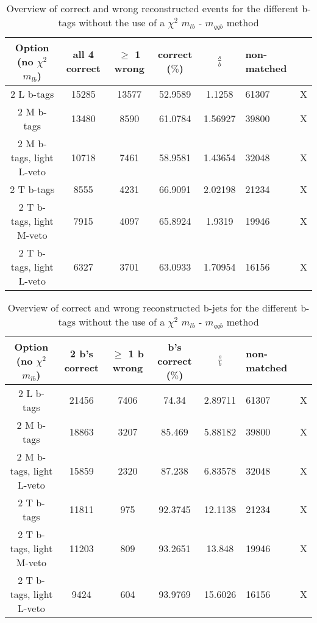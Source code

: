  \begin{table}[!h] 
 \begin{tabular}{c|c|c|c|c} 
\textbf{Option} (no $\chi^{2}$ $m_{lb}$) & all 4 correct & $\geq$ 1 wrong & correct ($\%$)       & $\frac{s}{b}$ & non-matched \\  L b-tags              & 15285 & 13577 & 52.9589 & 1.1258 & 61307 & X \\ 
2 M b-tags              & 13480 & 8590 & 61.0784 & 1.56927 & 39800 & X \\ 
2 M b-tags, light L-veto & 10718 & 7461 & 58.9581 & 1.43654 & 32048 & X \\ 
2 T b-tags              & 8555 & 4231 & 66.9091 & 2.02198 & 21234 & X \\ 
2 T b-tags, light M-veto & 7915 & 4097 & 65.8924 & 1.9319 & 19946 & X \\ 
2 T b-tags, light L-veto & 6327 & 3701 & 63.0933 & 1.70954 & 16156 & X \\ 
 \end{tabular} 
\caption{Overview of correct and wrong reconstructed events for the different b-tags without the use of a $\chi^{2}$ $m_{lb}$ - $m_{qqb}$ method} 
 \end{table} 
 
 \begin{table}[!h] 
 \begin{tabular}{c|c|c|c|c} 
\textbf{Option} (no $\chi^{2}$ $m_{lb}$) & 2 b's correct & $\geq$ 1 b wrong & b's correct ($\%$) & $\frac{s}{b}$ & non-matched \\  L b-tags              & 21456 & 7406 & 74.34 & 2.89711 & 61307 & X \\ 
2 M b-tags              & 18863 & 3207 & 85.469 & 5.88182 & 39800 & X \\ 
2 M b-tags, light L-veto & 15859 & 2320 & 87.238 & 6.83578 & 32048 & X \\ 
2 T b-tags              & 11811 & 975 & 92.3745 & 12.1138 & 21234 & X \\ 
2 T b-tags, light M-veto & 11203 & 809 & 93.2651 & 13.848 & 19946 & X \\ 
2 T b-tags, light L-veto & 9424 & 604 & 93.9769 & 15.6026 & 16156 & X \\ 
 \end{tabular} 
\caption{Overview of correct and wrong reconstructed b-jets for the different b-tags without the use of a $\chi^{2}$ $m_{lb}$ - $m_{qqb}$ method} 
 \end{table} 
 
